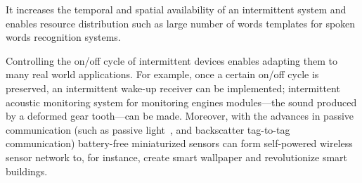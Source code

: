 %
 It increases the temporal and spatial availability of an intermittent system and enables resource distribution such as large number of words templates for spoken words recognition systems. 

Controlling the on/off cycle of intermittent devices enables adapting them to many real world applications. For example, once a certain on/off cycle is preserved, an intermittent wake-up receiver can be implemented; intermittent acoustic monitoring system for monitoring engines modules---the sound produced by a deformed gear tooth---can be made. Moreover, with the advances in passive communication (such as passive light~\cite{}, and backscatter tag-to-tag~\cite{} communication) battery-free miniaturized sensors can form self-powered wireless sensor network to, for instance, create smart wallpaper and revolutionize smart buildings. 


